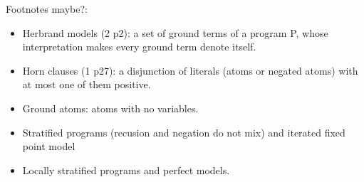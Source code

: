 Footnotes maybe?: 
\begin{itemize}
    \item Herbrand models (2 p2): a set of ground terms of a program P, whose interpretation 
    makes every ground term denote itself.
    \item Horn clauses (1 p27): a disjunction of literals (atoms or negated atoms) with at most one of 
    them positive.
    \item Ground atoms: atoms with no variables.
    \item Stratified programs (recusion and negation do not mix) and iterated fixed point model 
    \item Locally stratified programs and perfect models.
\end{itemize}